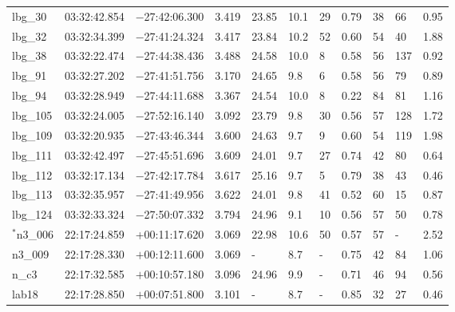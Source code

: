 \documentclass[fleqn,usenatbib]{mn2e}
\begin{document}
\begin{table*}
\begin{threeparttable}
\begin{tabular}{lllllllllll}
lbg\_30         & 03:32:42.854 & $-$27:42:06.300 & 3.419        & 23.85  & 10.1  & 29  & 0.79         & 38        & 66    & 0.95      \\
lbg\_32         & 03:32:34.399 & $-$27:41:24.324 & 3.417      & 23.84  & 10.2 & 52 & 0.60         & 54        & 40    & 1.88      \\
lbg\_38         & 03:32:22.474 & $-$27:44:38.436 & 3.488       & 24.58  & 10.0 & 8  & 0.58        & 56        & 137   & 0.92      \\
lbg\_91         & 03:32:27.202 & $-$27:41:51.756 & 3.170       & 24.65  & 9.8   & 6  & 0.58        & 56        & 79    & 0.89 \\
lbg\_94         & 03:32:28.949 & $-$27:44:11.688 & 3.367       & 24.54  & 10.0 & 8  & 0.22        & 84        & 81    & 1.16      \\
lbg\_105        & 03:32:24.005 & $-$27:52:16.140 & 3.092      & 23.79  & 9.8  & 30 & 0.56        & 57        & 128   & 1.72      \\
lbg\_109        & 03:32:20.935 & $-$27:43:46.344 & 3.600       & 24.63  & 9.7  & 9  & 0.60         & 54        & 119   & 1.98      \\
lbg\_111        & 03:32:42.497 & $-$27:45:51.696 & 3.609       & 24.01  & 9.7  & 27 & 0.74        & 42        & 80    & 0.64      \\
lbg\_112         & 03:32:17.134 & $-$27:42:17.784 & 3.617        & 25.16  & 9.7  & 5  & 0.79         & 38        & 43    & 0.46      \\
lbg\_113        & 03:32:35.957 & $-$27:41:49.956 & 3.622      & 24.01  & 9.8  & 41 & 0.52        & 60        & 15    & 0.87      \\
lbg\_124         & 03:32:33.324 & $-$27:50:07.332 & 3.794        & 24.96  & 9.1  & 10  & 0.56         & 57        & 50    & 0.78      \\
$^{*}$n3\_006       & 22:17:24.859 & +00:11:17.620 & 3.069     & 22.98 & 10.6 & 50 & 0.57         & 57        & -    & 2.52      \\
n3\_009       & 22:17:28.330 & $+$00:12:11.600 & 3.069 & -    & 8.7  & -            & 0.75        & 42        & 84    & 1.06      \\
n\_c3         & 22:17:32.585 & $+$00:10:57.180 & 3.096       & 24.96 & 9.9  & -            & 0.71        & 46        & 94    & 0.56      \\
lab18         & 22:17:28.850 & $+$00:07:51.800 & 3.101           & -    & 8.7  & -            & 0.85        & 32        & 27    & 0.46      \\

\end{tabular}
\end{threeparttable}
\end{table*}
\end{document}
